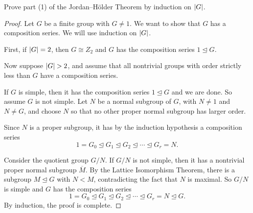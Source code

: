  Prove part (1) of the Jordan--H\"older Theorem by induction
on $\lvert{G}\rvert$.
\begin{proof}
  Let $G$ be a finite group with $G\neq1$. We want to show that $G$
  has a composition series. We will use induction on $\lvert{G}\rvert$.

  First, if $\lvert{G}\rvert = 2$, then $G\cong Z_2$ and $G$ has the
  composition series $1\trianglelefteq G$.

  Now suppose $\lvert{G}\rvert > 2$, and assume that all nontrivial groups
  with order strictly less than $G$ have a composition series.

  If $G$ is simple, then it has the composition series
  $1\trianglelefteq G$ and we are done. So assume $G$ is not
  simple. Let $N$ be a normal subgroup of $G$, with $N\neq1$ and
  $N\neq G$, and choose $N$ so that no other proper normal subgroup
  has larger order.

  Since $N$ is a proper subgroup, it has by the induction hypothesis a
  composition series
  \begin{equation*}
    1 = G_0 \trianglelefteq G_1 \trianglelefteq
    G_2 \trianglelefteq\cdots\trianglelefteq
    G_r = N.
  \end{equation*}

  Consider the quotient group $G/N$. If $G/N$ is not simple, then it
  has a nontrivial proper normal subgroup $\overline{M}$. By the
  Lattice Isomorphism Theorem, there is a subgroup
  $M\trianglelefteq G$ with $N<M$, contradicting the fact that $N$ is
  maximal. So $G/N$ is simple and $G$ has the composition series
  \begin{equation*}
    1 = G_0 \trianglelefteq G_1 \trianglelefteq
    G_2 \trianglelefteq\cdots\trianglelefteq
    G_r = N \trianglelefteq G.
  \end{equation*}
  By induction, the proof is complete.
\end{proof}
